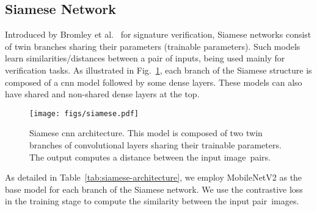 \documentclass[journal]{IEEEtran}
\begin{document}
\subsection{Siamese Network}
\label{sec:siamese}

Introduced by Bromley et al.~\cite{bromley1993siamese} for signature verification, Siamese networks consist of twin branches sharing their parameters (trainable parameters).
Such models learn similarities/distances between a pair of inputs, being used mainly for verification tasks.
As illustrated in Fig.~\ref{fig:siamese}, each branch of the Siamese structure is composed of a \gls{cnn} model followed by some dense layers.
These models can also have shared and non-shared dense layers at the top. 

\begin{figure}[!ht]
\centering
   	\texttt{[image: figs/siamese.pdf]}

\vspace{-0.5mm}

\caption{Siamese \gls{cnn} architecture. This model is composed of two twin branches of convolutional layers sharing their trainable parameters. The output computes a distance between the input image~pairs.}
\label{fig:siamese}
\end{figure}


As detailed in Table~\ref{tab:siamese-architecture}, we employ MobileNetV2 as the base model for each branch of the Siamese network.
We use the contrastive loss~\cite{chopra2005contrastive, hadsell2006contrastive} in the training stage to compute the similarity between the input pair~images. 

\begin{table}[!htb]
\centering
\caption{Siamese network architecture description.}
\label{tab:siamese-architecture}

\vspace{-1.5mm}

 \end{table}
\end{document}
